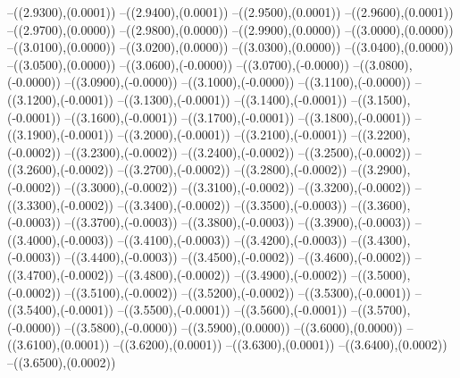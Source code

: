 {	--({\sx*(2.9300)},{\sy*(0.0001)})
	--({\sx*(2.9400)},{\sy*(0.0001)})
	--({\sx*(2.9500)},{\sy*(0.0001)})
	--({\sx*(2.9600)},{\sy*(0.0001)})
	--({\sx*(2.9700)},{\sy*(0.0000)})
	--({\sx*(2.9800)},{\sy*(0.0000)})
	--({\sx*(2.9900)},{\sy*(0.0000)})
	--({\sx*(3.0000)},{\sy*(0.0000)})
	--({\sx*(3.0100)},{\sy*(0.0000)})
	--({\sx*(3.0200)},{\sy*(0.0000)})
	--({\sx*(3.0300)},{\sy*(0.0000)})
	--({\sx*(3.0400)},{\sy*(0.0000)})
	--({\sx*(3.0500)},{\sy*(0.0000)})
	--({\sx*(3.0600)},{\sy*(-0.0000)})
	--({\sx*(3.0700)},{\sy*(-0.0000)})
	--({\sx*(3.0800)},{\sy*(-0.0000)})
	--({\sx*(3.0900)},{\sy*(-0.0000)})
	--({\sx*(3.1000)},{\sy*(-0.0000)})
	--({\sx*(3.1100)},{\sy*(-0.0000)})
	--({\sx*(3.1200)},{\sy*(-0.0001)})
	--({\sx*(3.1300)},{\sy*(-0.0001)})
	--({\sx*(3.1400)},{\sy*(-0.0001)})
	--({\sx*(3.1500)},{\sy*(-0.0001)})
	--({\sx*(3.1600)},{\sy*(-0.0001)})
	--({\sx*(3.1700)},{\sy*(-0.0001)})
	--({\sx*(3.1800)},{\sy*(-0.0001)})
	--({\sx*(3.1900)},{\sy*(-0.0001)})
	--({\sx*(3.2000)},{\sy*(-0.0001)})
	--({\sx*(3.2100)},{\sy*(-0.0001)})
	--({\sx*(3.2200)},{\sy*(-0.0002)})
	--({\sx*(3.2300)},{\sy*(-0.0002)})
	--({\sx*(3.2400)},{\sy*(-0.0002)})
	--({\sx*(3.2500)},{\sy*(-0.0002)})
	--({\sx*(3.2600)},{\sy*(-0.0002)})
	--({\sx*(3.2700)},{\sy*(-0.0002)})
	--({\sx*(3.2800)},{\sy*(-0.0002)})
	--({\sx*(3.2900)},{\sy*(-0.0002)})
	--({\sx*(3.3000)},{\sy*(-0.0002)})
	--({\sx*(3.3100)},{\sy*(-0.0002)})
	--({\sx*(3.3200)},{\sy*(-0.0002)})
	--({\sx*(3.3300)},{\sy*(-0.0002)})
	--({\sx*(3.3400)},{\sy*(-0.0002)})
	--({\sx*(3.3500)},{\sy*(-0.0003)})
	--({\sx*(3.3600)},{\sy*(-0.0003)})
	--({\sx*(3.3700)},{\sy*(-0.0003)})
	--({\sx*(3.3800)},{\sy*(-0.0003)})
	--({\sx*(3.3900)},{\sy*(-0.0003)})
	--({\sx*(3.4000)},{\sy*(-0.0003)})
	--({\sx*(3.4100)},{\sy*(-0.0003)})
	--({\sx*(3.4200)},{\sy*(-0.0003)})
	--({\sx*(3.4300)},{\sy*(-0.0003)})
	--({\sx*(3.4400)},{\sy*(-0.0003)})
	--({\sx*(3.4500)},{\sy*(-0.0002)})
	--({\sx*(3.4600)},{\sy*(-0.0002)})
	--({\sx*(3.4700)},{\sy*(-0.0002)})
	--({\sx*(3.4800)},{\sy*(-0.0002)})
	--({\sx*(3.4900)},{\sy*(-0.0002)})
	--({\sx*(3.5000)},{\sy*(-0.0002)})
	--({\sx*(3.5100)},{\sy*(-0.0002)})
	--({\sx*(3.5200)},{\sy*(-0.0002)})
	--({\sx*(3.5300)},{\sy*(-0.0001)})
	--({\sx*(3.5400)},{\sy*(-0.0001)})
	--({\sx*(3.5500)},{\sy*(-0.0001)})
	--({\sx*(3.5600)},{\sy*(-0.0001)})
	--({\sx*(3.5700)},{\sy*(-0.0000)})
	--({\sx*(3.5800)},{\sy*(-0.0000)})
	--({\sx*(3.5900)},{\sy*(0.0000)})
	--({\sx*(3.6000)},{\sy*(0.0000)})
	--({\sx*(3.6100)},{\sy*(0.0001)})
	--({\sx*(3.6200)},{\sy*(0.0001)})
	--({\sx*(3.6300)},{\sy*(0.0001)})
	--({\sx*(3.6400)},{\sy*(0.0002)})
	--({\sx*(3.6500)},{\sy*(0.0002)})
}
